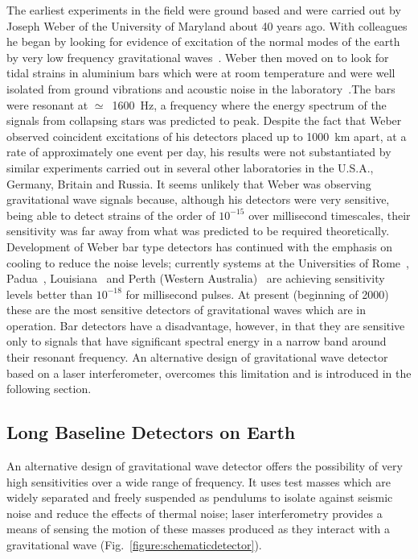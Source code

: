 \documentclass{article}
\begin{document}
The earliest experiments in the field were ground based and were carried out by
Joseph Weber of the University of Maryland about 40 years ago. With colleagues
he began by looking for evidence of excitation of the normal modes of the earth
by very low frequency gravitational waves~\cite{Forward2}. Weber then moved on
to look for tidal strains in aluminium bars which were at room temperature and
were well isolated from ground vibrations and acoustic noise in the
laboratory~\cite{Weber1, Weber2}.The bars were resonant at $\simeq$~1600~Hz, a
frequency where the energy spectrum of the signals from collapsing stars was
predicted to peak. Despite the fact that Weber observed coincident excitations
of his detectors placed up to 1000~km apart, at a rate of approximately one
event per day, his results were not substantiated by similar experiments carried
out in several other laboratories in the U.S.A., Germany, Britain and Russia. It
seems unlikely that Weber was observing gravitational wave signals because,
although his detectors were very sensitive, being able to detect strains of the
order of $10^{-15}$ over millisecond timescales, their sensitivity was far away
from what was predicted to be required theoretically. Development of Weber bar
type detectors has continued with the emphasis on cooling to reduce the noise
levels; currently systems at the Universities of Rome~\cite{Astone},
Padua~\cite{Prodi}, Louisiana~\cite{Amaldi} and Perth (Western
Australia)~\cite{Heng} are achieving sensitivity levels better than $10^{-18}$
for millisecond pulses. At present (beginning of 2000) these are the most
sensitive detectors of gravitational waves which are in operation. Bar detectors
have a disadvantage, however, in that they are sensitive only to signals that
have significant spectral energy in a narrow band around their resonant
frequency. An alternative design of gravitational wave detector based on a laser
interferometer, overcomes this limitation and is introduced in the following
section.





\subsection{Long Baseline Detectors on Earth}
\label{subsection:earth}

An alternative design of gravitational wave detector offers the
possibility of very high sensitivities over a wide range of
frequency. It uses test masses which are widely separated and freely
suspended as pendulums to isolate against seismic noise and reduce the
effects of thermal noise; laser interferometry provides a means of
sensing the motion of these masses produced as they interact with a
gravitational wave (Fig.~\ref{figure:schematicdetector}).
\end{document}
